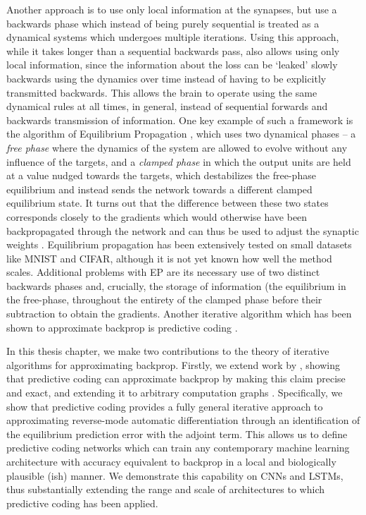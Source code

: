 Another approach is to use only local information at the synapses, but use a backwards phase which instead of being purely sequential is treated as a dynamical systems which undergoes multiple iterations. Using this approach, while it takes longer than a sequential backwards pass, also allows using only local information, since the information about the loss can be `leaked' slowly backwards using the dynamics over time instead of having to be explicitly transmitted backwards. This allows the brain to operate using the same dynamical rules at all times, in general, instead of sequential forwards and backwards transmission of information. One key example of such a framework is the algorithm of Equilibrium Propagation \citep{bengio2017stdp,scellier2017equilibrium,scellier2018extending,scellier2018generalization}, which uses two dynamical phases -- a \emph{free phase} where the dynamics of the system are allowed to evolve without any influence of the targets, and a \emph{clamped phase} in which the output units are held at a value nudged towards the targets, which destabilizes the free-phase equilibrium and instead sends the network towards a different clamped equilibrium state. It turns out that the difference between these two states corresponds closely to the gradients which would otherwise have been backpropagated through the network and can thus be used to adjust the synaptic weights \citep{scellier2017equilibrium}. Equilibrium propagation has been extensively tested on small datasets like MNIST and CIFAR, although it is not yet known how well the method scales. Additional problems with EP are its necessary use of two distinct backwards phases and, crucially, the storage of information (the equilibrium in the free-phase, throughout the entirety of the clamped phase before their subtraction to obtain the gradients. Another iterative algorithm which has been shown to approximate backprop is predictive coding \citep{whittington2017approximation}.

In this thesis chapter, we make two contributions to the theory of iterative algorithms for approximating backprop. Firstly, we extend work by \citet{whittington2017approximation}, showing that predictive coding can approximate backprop by making this claim precise and exact, and extending it to arbitrary computation graphs \citep{millidge2020predictive}. Specifically, we show that predictive coding provides a fully general iterative approach to approximating reverse-mode automatic differentiation through an identification of the equilibrium prediction error with the adjoint term. This allows us to define predictive coding networks which can train any contemporary machine learning architecture with accuracy equivalent to backprop in a local and biologically plausible (ish) manner. We demonstrate this capability on CNNs and LSTMs, thus substantially extending the range and scale of architectures to which predictive coding has been applied. 

